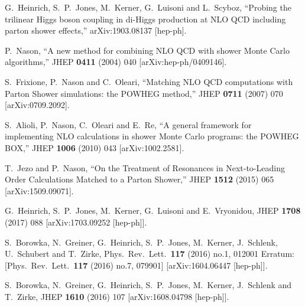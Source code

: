 \documentclass[paper]{JHEP3}
\begin{document}
\begin{thebibliography}{10}

  G.~Heinrich, S.~P.~Jones, M.~Kerner, G.~Luisoni and L.~Scyboz,
  ``Probing the trilinear Higgs boson coupling in di-Higgs production at NLO QCD including parton shower effects,''
  arXiv:1903.08137 [hep-ph].

  P.~Nason,
  ``A new method for combining NLO QCD with shower Monte Carlo algorithms,''
  JHEP {\bf 0411} (2004) 040
  [arXiv:hep-ph/0409146].

  S.~Frixione, P.~Nason and C.~Oleari,
  ``Matching NLO QCD computations with Parton Shower simulations: the POWHEG method,''
  JHEP {\bf 0711} (2007) 070
  [arXiv:0709.2092].

  S.~Alioli, P.~Nason, C.~Oleari and E.~Re,
  ``A general framework for implementing NLO calculations in shower Monte Carlo programs: the POWHEG BOX,''
  JHEP {\bf 1006} (2010) 043
  [arXiv:1002.2581].

  T.~Jezo and P.~Nason,
  ``On the Treatment of Resonances in Next-to-Leading Order Calculations Matched to a Parton Shower,''
  JHEP {\bf 1512} (2015) 065
  [arXiv:1509.09071].

  G.~Heinrich, S.~P.~Jones, M.~Kerner, G.~Luisoni and E.~Vryonidou,
  JHEP {\bf 1708} (2017) 088
  [arXiv:1703.09252 [hep-ph]].

  S.~Borowka, N.~Greiner, G.~Heinrich, S.~P.~Jones, M.~Kerner, J.~Schlenk, U.~Schubert and T.~Zirke,
  Phys.\ Rev.\ Lett.\  {\bf 117} (2016) no.1,  012001
   Erratum: [Phys.\ Rev.\ Lett.\  {\bf 117} (2016) no.7,  079901]
  [arXiv:1604.06447 [hep-ph]].

  S.~Borowka, N.~Greiner, G.~Heinrich, S.~P.~Jones, M.~Kerner, J.~Schlenk and T.~Zirke,
  JHEP {\bf 1610} (2016) 107
  [arXiv:1608.04798 [hep-ph]].


\end{thebibliography}
\end{document}
